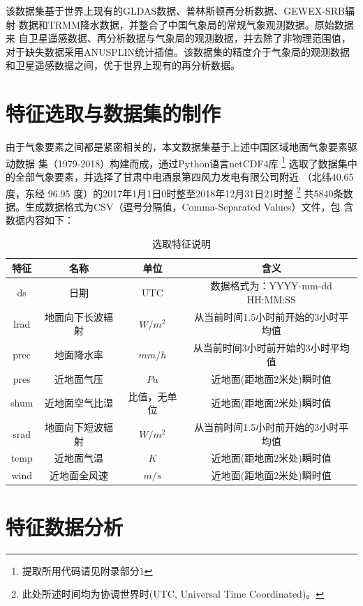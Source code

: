 \documentclass[AutoFakeBold]{LZUThesis}
\begin{document}
该数据集基于世界上现有的GLDAS数据、普林斯顿再分析数据、GEWEX-SRB辐射
数据和TRMM降水数据，并整合了中国气象局的常规气象观测数据。原始数据来
自卫星遥感数据、再分析数据与气象局的观测数据，并去除了非物理范围值，
对于缺失数据采用ANUSPLIN统计插值。该数据集的精度介于气象局的观测数据
和卫星遥感数据之间，优于世界上现有的再分析数据。\cite{6bab74c1-f2dd-4e24-a833-81f33bedf9b1}

\section{特征选取与数据集的制作}
由于气象要素之间都是紧密相关的，本文数据集基于上述中国区域地面气象要素驱动数据
集（1979-2018）构建而成，通过Python语言netCDF4库
\footnote{提取所用代码请见附录部分1}
选取了数据集中的全部气象要素，并选择了甘肃中电酒泉第四风力发电有限公司附近
（北纬40.65 度，东经 96.95 度）的2017年1月1日0时整至2018年12月31日21时整
\footnote{此处所述时间均为协调世界时(UTC, Universal Time Coordinated)。}
共5840条数据。生成数据格式为CSV（逗号分隔值，Comma-Separated Values）文件，包
含数据内容如下：

\begin{table}[H]
    \centering
    \caption{选取特征说明}
    \begin{tabular}{cccc}
    \toprule
    特征 & 名称 & 单位 & 含义 \\
    \midrule
    ds & 日期 & UTC & 数据格式为：YYYY-mm-dd HH:MM:SS \\
    lrad & 地面向下长波辐射 & $W/m^2$ & 从当前时间1.5小时前开始的3小时平均值 \\
    prec & 地面降水率 & $mm/h$ & 从当前时间3小时前开始的3小时平均值 \\
    pres & 近地面气压 & $Pa$ & 近地面(距地面2米处)瞬时值 \\
    shum & 近地面空气比湿 & 比值，无单位 & 近地面(距地面2米处)瞬时值 \\
    srad & 地面向下短波辐射 & $W/m^2$ & 从当前时间1.5小时前开始的3小时平均值 \\
    temp & 近地面气温 & $K$ & 近地面(距地面2米处)瞬时值 \\
    wind & 近地面全风速 & $m/s$ & 近地面(距地面2米处)瞬时值 \\
    \bottomrule
    \end{tabular}
    \label{features}
\end{table}

\section{特征数据分析}
\end{document}
